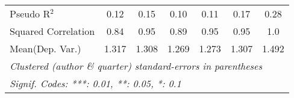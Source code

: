 \begin{tabular}{lcccccc}
   Pseudo R$^2$                                               & 0.12         & 0.15    & 0.10    & 0.11    & 0.17           & 0.28\\  
   Squared Correlation                                        & 0.84         & 0.95    & 0.89    & 0.95    & 0.95           & 1.0\\  
Mean(Dep. Var.) & 1.317 & 1.308 & 1.269 & 1.273 & 1.307 & 1.492 \\
   \midrule \midrule
   \multicolumn{7}{l}{\emph{Clustered (author \& quarter) standard-errors in parentheses}}\\
   \multicolumn{7}{l}{\emph{Signif. Codes: ***: 0.01, **: 0.05, *: 0.1}}\\
\end{tabular}
\par\endgroup

